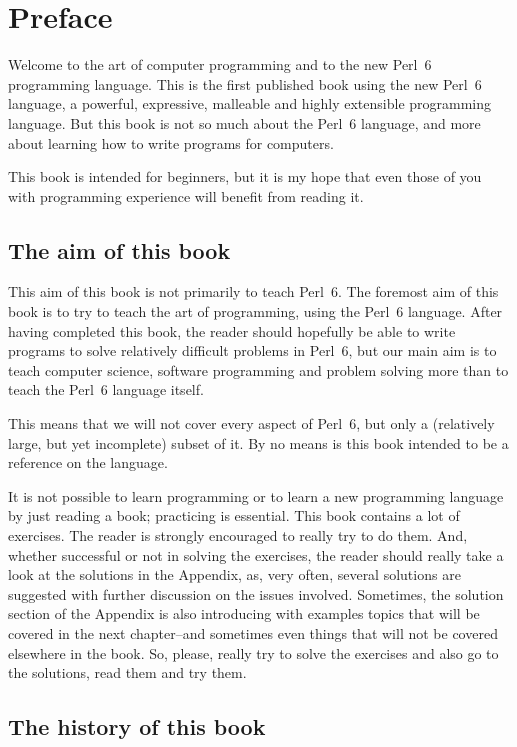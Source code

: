 
\chapter{Preface}

Welcome to the art of computer programming and to the 
new Perl~6 programming language. This is the 
first published book using the new Perl~6 language, 
a powerful, expressive, malleable and highly extensible 
programming language. But this book is not so much 
about the Perl~6 language, and more about learning 
how to write programs for computers. 

This book is intended for beginners, but it is my hope 
that even those of you with programming experience will 
benefit from reading it.

\section*{The aim of this book}

This aim of this book is not primarily to teach Perl~6. 
The foremost aim of this book is to try to teach the art 
of programming, using the Perl~6 language. After having 
completed this book, the reader should hopefully be able 
to write programs to solve relatively difficult problems in 
Perl~6, but our main aim is to teach computer science, software 
programming and problem solving more than to teach the Perl~6 
language itself. 

This means that we will not cover every aspect of Perl~6, but 
only a (relatively large, but yet incomplete) subset of it. 
By no means is this book intended to be a reference on the 
language.

It is not possible to learn programming or to learn a new 
programming language by just reading a book; practicing 
is essential. This book contains a lot of exercises. The 
reader is strongly encouraged to really try to do them. And, 
whether successful or not in solving the exercises, the reader 
should really take a look at the solutions in the Appendix, 
as, very often, several solutions are suggested with further 
discussion on the issues involved. Sometimes, the solution 
section of the Appendix is also introducing with examples topics 
that will be covered in the next chapter--and sometimes even 
things that will not be covered elsewhere in the book. So, 
please, really try to solve the exercises and also go to 
the solutions, read them and try them.


\section*{The history of this book}

